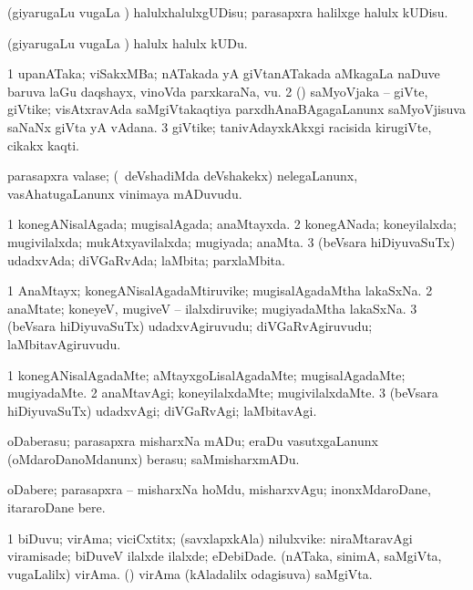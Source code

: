 \bentry
{}
\gl{\sakirx}
\bmng
(giyarugaLu \mo vugaLa \vi) halulxhalulxgUDisu; parasapxra halilxge halulx kUDisu. 
\emng

\noindent 
\gl{\akirx}
\bmng
(giyarugaLu \mo vugaLa \vi) halulx halulx kUDu. 
\emng
\eentry

\bentry
{}
\gl{\nA}
\bmng
\bnum
\num{1} upanATaka; viSakxMBa; nATakada yA giVtanATakada aMkagaLa naDuve baruva laGu daqshayx, vinoVda parxkaraNa, \mo vu. 
\num{2} (\saM) saMyoVjaka -- giVte, giVtike; visAtxravAda saMgiVtakaqtiya parxdhAnaBAgagaLanunx saMyoVjisuva saNaNx giVta yA vAdana. 
\num{3} giVtike; tanivAdayxkAkxgi racisida kirugiVte, cikakx kaqti. 
\enum
\emng
\eentry

\bentry
{}
\gl{\nA}
\bmng
parasapxra valase; (\sA\ deVshadiMda deVshakekx) nelegaLanunx, vasAhatugaLanunx vinimaya mADuvudu. 
\emng
\eentry

\bentry
{}
\gl{\gu}
\bmng
\bnum
\num{1} konegANisalAgada; mugisalAgada; anaMtayxda. 
\num{2} konegANada; koneyilalxda; mugivilalxda; mukAtxyavilalxda; mugiyada; anaMta. 
\num{3} (beVsara hiDiyuvaSuTx) udadxvAda; diVGaRvAda; laMbita; parxlaMbita. 
\enum
\emng
\eentry

\bentry
{}
\gl{\nA}
\bmng
\bnum
\num{1} AnaMtayx; konegANisalAgadaMtiruvike; mugisalAgadaMtha lakaSxNa. 
\num{2} anaMtate; koneyeV, mugiveV -- ilalxdiruvike; mugiyadaMtha lakaSxNa. 
\num{3} (beVsara hiDiyuvaSuTx) udadxvAgiruvudu; diVGaRvAgiruvudu; laMbitavAgiruvudu. 
\enum
\emng
\eentry

\bentry
{}
\gl{\kirxvi}
\bmng
\bnum
\num{1} konegANisalAgadaMte; aMtayxgoLisalAgadaMte; mugisalAgadaMte; mugiyadaMte. 
\num{2} anaMtavAgi; koneyilalxdaMte; mugivilalxdaMte. 
\num{3} (beVsara hiDiyuvaSuTx) udadxvAgi; diVGaRvAgi; laMbitavAgi. 
\enum
\emng
\eentry

\bentry
{}
\gl{\sakirx}
\bmng
oDaberasu; parasapxra misharxNa mADu; eraDu vasutxgaLanunx (oMdaroDanoMdanunx) berasu; saMmisharxmADu. 
\emng

\noindent 
\gl{\akirx}
\bmng
oDabere; parasapxra -- misharxNa hoMdu, misharxvAgu; inonxMdaroDane, itararoDane bere. 
\emng
\eentry

\bentry
{}
\gl{\nA}
\bmng
\bnum
\num{1} biDuvu; virAma; viciCxtitx; (savxlapxkAla) nilulxvike:  niraMtaravAgi viramisade; biDuveV ilalxde ilalxde; eDebiDade. 
 (nATaka, sinimA, saMgiVta, \mo vugaLalilx) 
\banum
{} virAma. 
 (\ame) virAma (kAladalilx odagisuva) saMgiVta. 
\eanum
\numie
\enum
\emng
\eentry

